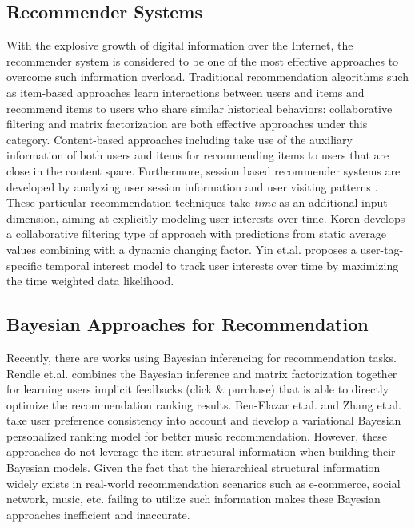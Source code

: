 \subsection{Recommender Systems}
With the explosive growth of digital information over the Internet, the recommender system is considered to be one of the most effective approaches to overcome such information overload. Traditional recommendation algorithms such as item-based approaches learn interactions between users and items and recommend items to users who share similar historical behaviors: collaborative filtering \cite{Sarwar:2001:ICF:371920.372071,Su:2009:SCF:1592474.1722966} and matrix factorization \cite{Rendle:2010:FPM} are both effective approaches under this category.  Content-based approaches including \cite{2011rsh..book...73L,Liu:2011,Yuan:2015} take use of the auxiliary information of both users and items for recommending items to users that are close in the content space.  Furthermore, session based recommender systems are developed by analyzing user session information and user visiting patterns \cite{Gultekin_acollaborative,Tang_review:2013}. These particular recommendation techniques take \emph{time} as an additional input dimension, aiming at explicitly modeling user interests over time.  Koren \cite{Koren:2010} develops a collaborative filtering type of approach with predictions from static average values combining with a dynamic changing factor. Yin et.al. \cite{Yin:2011} proposes a user-tag-specific temporal interest model to track user interests over time by maximizing the time weighted data likelihood.  %

\subsection{Bayesian Approaches for Recommendation}
Recently, there are works using Bayesian inferencing for recommendation tasks.  Rendle et.al. \cite{rendle2009bpr} combines the Bayesian inference and matrix factorization together for learning users implicit feedbacks (click \& purchase) that is able to directly optimize the recommendation ranking results. Ben-Elazar et.al. \cite{Ben-Elazar:2017} and Zhang et.al. \cite{zhang2007efficient} take user preference consistency into account and develop a variational Bayesian personalized ranking model for better music recommendation.  However, these approaches do not leverage the item structural information when building their Bayesian models.  Given the fact that the hierarchical structural information widely exists in real-world recommendation scenarios such as e-commerce, social network, music, etc. failing to utilize such information makes these Bayesian approaches inefficient and inaccurate.  

